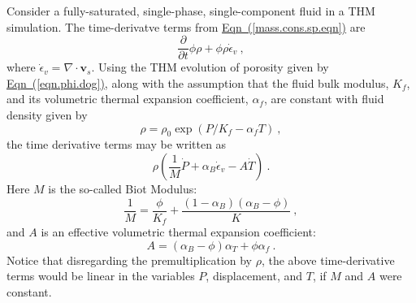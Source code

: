 \documentclass[12pt]{report}
\begin{document}
Consider a fully-saturated, single-phase, single-component fluid in a
THM simulation.  The time-derivatve terms from
\hyperref[mass.cons.sp.eqn]{Eqn~(\ref*{mass.cons.sp.eqn})} are
\begin{equation}
\frac{\partial}{\partial t} \phi \rho + \phi\rho\dot{\epsilon}_{v} \ ,
\end{equation}
where $\dot{\epsilon}_{v} = \nabla\cdot {\mathbf v}_{s}$.  Using the
THM evolution of porosity given by
\hyperref[eqn.phi.dog]{Eqn~(\ref*{eqn.phi.dog})}, along with the
assumption that the fluid bulk modulus, $K_{f}$, and its volumetric
thermal expansion coefficient, $\alpha_{f}$, are constant with fluid
density given by
\begin{equation}
\rho = \rho_{0}\exp(P/K_{f} - \alpha_{f} T) \ ,
\end{equation}
the time derivative terms may be written as
\begin{equation}
\rho \left( \frac{1}{M}\dot{P} + \alpha_{B}\dot{\epsilon}_{v} -
A\dot{T} \right) \ .
\end{equation}
Here $M$ is the so-called Biot Modulus:
\begin{equation}
\frac{1}{M} = \frac{\phi}{K_{f}} + \frac{(1 - \alpha_{B})(\alpha_{B} -
  \phi)}{K} \ ,
\label{biot.mod.eqn}
\end{equation}
and $A$ is an effective volumetric thermal expansion coefficient:
\begin{equation}
A = (\alpha_{B} - \phi)\alpha_{T} + \phi\alpha_{f} \ .
\label{therm.ex.eqn}
\end{equation}
Notice that disregarding the premultiplication by $\rho$, the above
time-derivative terms would be linear in the variables $P$,
displacement, and $T$, if $M$ and $A$ were constant.
\end{document}
